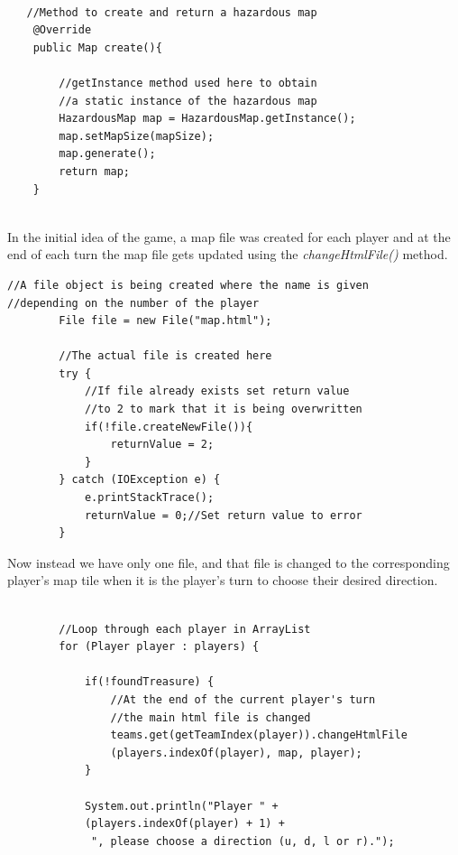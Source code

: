 \documentclass[a4paper,12pt]{extarticle}
\begin{document}
\begin{lstlisting}

   //Method to create and return a hazardous map
    @Override
    public Map create(){

        //getInstance method used here to obtain 
        //a static instance of the hazardous map
        HazardousMap map = HazardousMap.getInstance();
        map.setMapSize(mapSize);
        map.generate();
        return map;
    }


\end{lstlisting}
\vspace{4mm}

\noindent In the initial idea of the game, a map file was created for each player and at the end of each turn the map file gets updated using the \textit{changeHtmlFile()} method.

\begin{lstlisting}
//A file object is being created where the name is given 
//depending on the number of the player
        File file = new File("map.html");

        //The actual file is created here
        try {
            //If file already exists set return value
            //to 2 to mark that it is being overwritten
            if(!file.createNewFile()){
                returnValue = 2;
            }
        } catch (IOException e) {
            e.printStackTrace();
            returnValue = 0;//Set return value to error
        }
\end{lstlisting}
\vspace{4mm}

\noindent Now instead we have only one file, and that file is changed to the corresponding player's map tile when it is the player's turn to choose their desired direction.

\begin{lstlisting}
 
        //Loop through each player in ArrayList
        for (Player player : players) {

            if(!foundTreasure) {
                //At the end of the current player's turn 
                //the main html file is changed
                teams.get(getTeamIndex(player)).changeHtmlFile
                (players.indexOf(player), map, player);
            }

            System.out.println("Player " + 
            (players.indexOf(player) + 1) +
             ", please choose a direction (u, d, l or r).");
\end{lstlisting}
\end{document}
